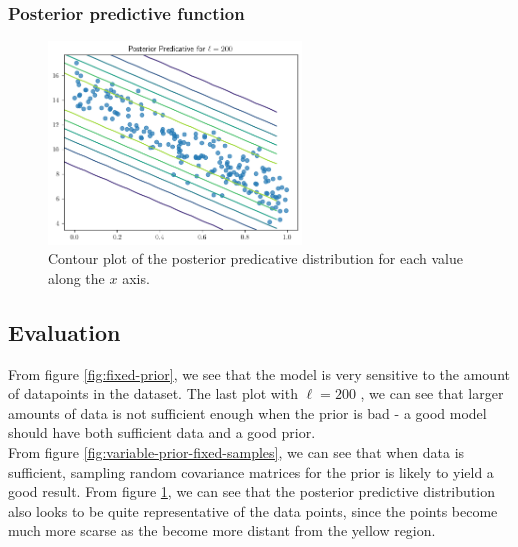 \subsubsection{Posterior predictive function}
\begin{figure}[H]
  \centering
  \includegraphics[width=0.6\textwidth]{assets/week1/posterior-predictive-1.png}
  \caption{Contour plot of the posterior predicative distribution for each value along the $x$ axis.}
  \label{fig:posterior-predictive-1}
\end{figure}
\subsection{Evaluation}
From figure \ref{fig:fixed-prior}, we see that the model is very sensitive to the amount of datapoints
in the dataset. The last plot with $\ell=200$ , we can see that larger amounts of 
data is not sufficient enough when the prior is bad - a good model should have both sufficient data and a good prior.\\
From figure \ref{fig:variable-prior-fixed-samples}, we can see that when data is sufficient, sampling random covariance matrices for the prior is likely to yield a good result.
From figure \ref{fig:posterior-predictive-1}, we can see that the posterior predictive distribution also looks to be quite representative of the data points, since the points become much more scarse as the become more distant from the yellow region.
